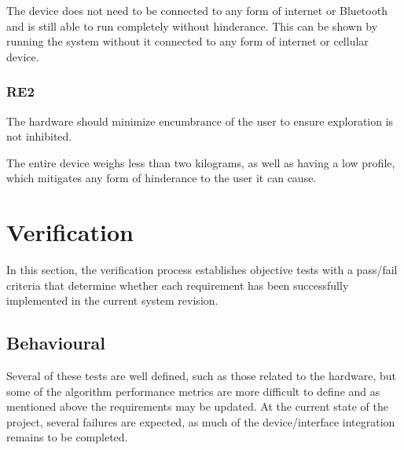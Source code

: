 \documentclass[11pt]{article}
\begin{document}
	The device does not need to be connected to any form of internet or Bluetooth and is still able to run completely without hinderance. This can be shown by running the system without it connected to any form of internet or cellular device. 
	
	\subsubsection{RE2} 
	
	\begin{exampleblock}
		The hardware should minimize encumbrance of the user to ensure exploration is not inhibited.
	\end{exampleblock}
	
	The entire device weighs less than two kilograms, as well as having a low profile, which mitigates any form of hinderance to the user it can cause.
	
	
	\section{Verification}
	
	In this section, the verification process establishes objective tests with a pass/fail criteria that determine whether each requirement has been successfully implemented in the current system revision.
	
	\subsection{Behavioural} 
	
	Several of these tests are well defined, such as those related to the hardware, but some of the algorithm performance metrics are more difficult to define and as mentioned above the requirements may be updated. At the current state of the project, several failures are expected, as much of the device/interface integration remains to be completed. 
	
\end{document}
